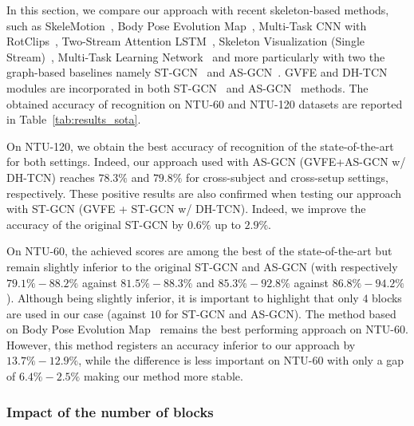 \documentclass{article}
\begin{document}
In this section, we compare our approach with recent skeleton-based methods, such as SkeleMotion~\cite{caetano2019skelemotion}, Body Pose Evolution Map~\cite{liu2018recognizing}, Multi-Task CNN with RotClips~\cite{ke2018learning}, Two-Stream Attention LSTM~\cite{liu2017skeleton}, Skeleton Visualization (Single Stream)~\cite{liu2017enhanced}, Multi-Task Learning Network~\cite{ke2017new} and more particularly with two the graph-based baselines namely ST-GCN~\cite{yan2018spatial} and AS-GCN~\cite{li2019actional}. GVFE and DH-TCN modules are incorporated in both ST-GCN~\cite{yan2018spatial} and AS-GCN~\cite{li2019actional} methods. The obtained accuracy of recognition on NTU-60 and NTU-120 datasets are reported in Table~\ref{tab:results_sota}.  

On NTU-120, we obtain the best accuracy of recognition of the state-of-the-art for both settings. Indeed, our approach used with AS-GCN (GVFE+AS-GCN w/ DH-TCN) reaches $78.3\%$ and $79.8\%$ for cross-subject and cross-setup settings, respectively. These positive results are also confirmed when testing our approach with ST-GCN (GVFE + ST-GCN w/ DH-TCN). Indeed, we improve the accuracy of the original ST-GCN by $0.6\%$ up to $2.9\%$.   

On NTU-60, the achieved scores are among the best of the state-of-the-art but remain slightly inferior to the original ST-GCN and AS-GCN (with respectively $79.1\%-88.2\%$ against $81.5\%-88.3\%$ and $85.3\%-92.8\%$ against $86.8\%-94.2\%$). Although being slightly inferior, it is important to highlight that only $4$ blocks are used in our case (against $10$ for ST-GCN and AS-GCN). The method based on Body Pose Evolution Map~\cite{liu2018recognizing} remains the best performing approach on NTU-60. 
However, this method registers an accuracy inferior to our approach by $13.7\%-12.9\%$, while the difference is less important on NTU-60 with only a gap of $6.4\%-2.5\%$ making our method more stable.

\subsubsection{Impact of the number of blocks}
\end{document}

